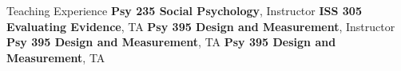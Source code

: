 \begin{rubric}{Teaching Experience}
\entry*[Summer 2019]\textbf{Psy 235 Social Psychology}, Instructor
\entry*[Fall 2018]\textbf{ISS 305 Evaluating Evidence}, TA
\entry*[Summer 2017] \textbf{Psy 395 Design and Measurement}, Instructor
\entry*[Spring 2017] \textbf{Psy 395 Design and Measurement}, TA
\entry*[Fall 2016] \textbf{Psy 395 Design and Measurement}, TA
\end{rubric}
